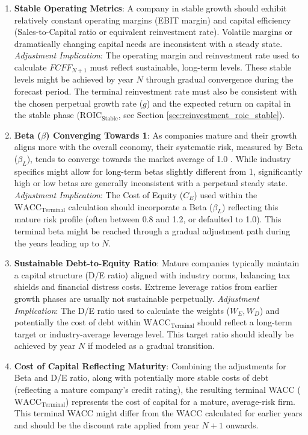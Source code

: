 \begin{enumerate}
    \item \textbf{Stable Operating Metrics}: A company in stable growth should exhibit relatively constant operating margins (EBIT margin) and capital efficiency (Sales-to-Capital ratio or equivalent reinvestment rate). Volatile margins or dramatically changing capital needs are inconsistent with a steady state.
          \textit{Adjustment Implication}: The operating margin and reinvestment rate used to calculate \(FCFF_{N+1}\) must reflect sustainable, long-term levels. These stable levels might be achieved by year \(N\) through gradual convergence during the forecast period. The terminal reinvestment rate must also be consistent with the chosen perpetual growth rate (\(g\)) and the expected return on capital in the stable phase (\(\text{ROIC}_{\text{Stable}}\), see Section \ref{sec:reinvestment_roic_stable}).

    \item \textbf{Beta (\(\beta\)) Converging Towards 1}: As companies mature and their growth aligns more with the overall economy, their systematic risk, measured by Beta (\(\beta_L\)), tends to converge towards the market average of 1.0 \parencite{blume1971,blume1975}. While industry specifics might allow for long-term betas slightly different from 1, significantly high or low betas are generally inconsistent with a perpetual steady state.
          \textit{Adjustment Implication}: The Cost of Equity (\(C_E\)) used within the \(\text{WACC}_{\text{Terminal}}\) calculation should incorporate a Beta (\(\beta_L\)) reflecting this mature risk profile (often between 0.8 and 1.2, or defaulted to 1.0). This terminal beta might be reached through a gradual adjustment path during the years leading up to \(N\).

    \item \textbf{Sustainable Debt-to-Equity Ratio}: Mature companies typically maintain a capital structure (D/E ratio) aligned with industry norms, balancing tax shields and financial distress costs. Extreme leverage ratios from earlier growth phases are usually not sustainable perpetually.
          \textit{Adjustment Implication}: The D/E ratio used to calculate the weights (\(W_E, W_D\)) and potentially the cost of debt within \(\text{WACC}_{\text{Terminal}}\) should reflect a long-term target or industry-average leverage level. This target ratio should ideally be achieved by year \(N\) if modeled as a gradual transition.

    \item \textbf{Cost of Capital Reflecting Maturity}: Combining the adjustments for Beta and D/E ratio, along with potentially more stable costs of debt (reflecting a mature company's credit rating), the resulting terminal WACC (\(\text{WACC}_{\text{Terminal}}\)) represents the cost of capital for a mature, average-risk firm. This terminal WACC might differ from the WACC calculated for earlier years and should be the discount rate applied from year \(N+1\) onwards.
\end{enumerate}

